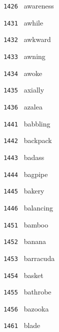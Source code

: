 \documentclass[11pt]{article}
\begin{document}
\begin{multicols}{6}
\noindent \texttt{ 1426 } \hspace{1mm} awareness  \par
\noindent \texttt{ 1431 } \hspace{1mm} awhile  \par
\noindent \texttt{ 1432 } \hspace{1mm} awkward  \par
\noindent \texttt{ 1433 } \hspace{1mm} awning  \par
\noindent \texttt{ 1434 } \hspace{1mm} awoke  \par
\noindent \texttt{ 1435 } \hspace{1mm} axially  \par
\noindent \texttt{ 1436 } \hspace{1mm} azalea  \par
\noindent \texttt{ 1441 } \hspace{1mm} babbling  \par
\noindent \texttt{ 1442 } \hspace{1mm} backpack  \par
\noindent \texttt{ 1443 } \hspace{1mm} badass  \par
\noindent \texttt{ 1444 } \hspace{1mm} bagpipe  \par
\noindent \texttt{ 1445 } \hspace{1mm} bakery  \par
\noindent \texttt{ 1446 } \hspace{1mm} balancing  \par
\noindent \texttt{ 1451 } \hspace{1mm} bamboo  \par
\noindent \texttt{ 1452 } \hspace{1mm} banana  \par
\noindent \texttt{ 1453 } \hspace{1mm} barracuda  \par
\noindent \texttt{ 1454 } \hspace{1mm} basket  \par
\noindent \texttt{ 1455 } \hspace{1mm} bathrobe  \par
\noindent \texttt{ 1456 } \hspace{1mm} bazooka  \par
\noindent \texttt{ 1461 } \hspace{1mm} blade  \par

\end{multicols}
\end{document}
